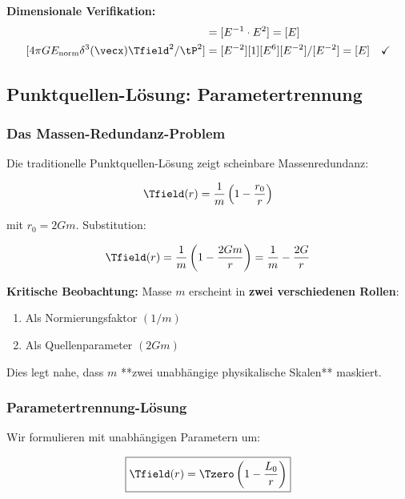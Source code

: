 	\textbf{Dimensionale Verifikation:}
	\begin{align}
		[\nabla^2 \Tfield] &= [E^{-1} \cdot E^2] = [E] \\
		[4\pi G E_{\text{norm}} \delta^3(\vecx) \Tfield^2/\tP^2] &= [E^{-2}][1][E^6][E^{-2}]/[E^{-2}] = [E] \quad \checkmark
	\end{align}
	
	\subsection{Punktquellen-Lösung: Parametertrennung}
	\label{subsec:point_source_elimination}
	
	\subsubsection{Das Massen-Redundanz-Problem}
	
	Die traditionelle Punktquellen-Lösung zeigt scheinbare Massenredundanz:
	
	\begin{equation}
		\Tfield(r) = \frac{1}{m}\left(1 - \frac{r_0}{r}\right)
		\label{eq:point_source_original}
	\end{equation}
	
	mit $r_0 = 2Gm$. Substitution:
	
	\begin{equation}
		\Tfield(r) = \frac{1}{m}\left(1 - \frac{2Gm}{r}\right) = \frac{1}{m} - \frac{2G}{r}
		\label{eq:mass_redundancy}
	\end{equation}
	
	\textbf{Kritische Beobachtung:} Masse $m$ erscheint in \textbf{zwei verschiedenen Rollen}:
	\begin{enumerate}
		\item Als Normierungsfaktor $(1/m)$
		\item Als Quellenparameter $(2Gm)$
	\end{enumerate}
	
	Dies legt nahe, dass $m$ **zwei unabhängige physikalische Skalen** maskiert.
	
	\subsubsection{Parametertrennung-Lösung}
	
	Wir formulieren mit unabhängigen Parametern um:
	
	\begin{equation}
		\boxed{\Tfield(r) = \Tzero\left(1 - \frac{L_0}{r}\right)}
		\label{eq:point_source_mass_free}
	\end{equation}
	

